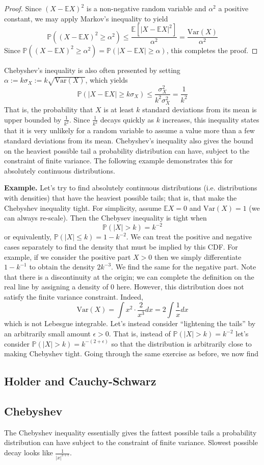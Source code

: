 \documentclass[12pt]{article}
\newcommand*{\abs}[1]{\left\lvert#1\right\rvert}
\newcommand{\E}{\mathbb{E}}
\newcommand{\Var}{\mathrm{Var}}
\newcommand{\Prob}{\mathbb{P}}
\begin{document}
\begin{proof}
Since $(X - \E X)^2$ is a non-negative random variable and $\alpha^2$ a positive constant, we may apply Markov's inequality to yield
\[\Prob((X - \E X)^2 \geq \alpha^2) \leq \frac{\E\left[\abs{X - \E X}^2\right]}{\alpha^2} = \frac{\Var(X)}{\alpha^2}\]
Since $\Prob((X - \E X)^2 \geq \alpha^2) = \Prob(\abs{X - \E X} \geq \alpha)$, this completes the proof. 
\end{proof}
Chebyshev's inequality is also often presented by setting $\alpha := k\sigma_X := k\sqrt{\Var(X)}$, which yields
\[\Prob(\abs{X - \E X} \geq k\sigma_X) \leq \frac{\sigma_X^2}{k^2 \sigma_X^2} = \frac{1}{k^2}\]
That is, the probability that $X$ is at least $k$ standard deviations from its mean is upper bounded by $\frac{1}{k^2}$. Since $\frac{1}{k^2}$ decays quickly as $k$ increases, this inequality states that it is 
very unlikely for a random variable to assume a value more than a few standard deviations from its mean. Chebyshev's inequality also gives the bound on the heaviest possible tail a probability distribution can 
have, subject to the constraint of finite variance. The following example demonstrates this for absolutely continuous distributions. 

\bigskip
\textbf{Example.} Let's try to find absolutely continuous distributions (i.e. distributions with densities) that have the heaviest possible tails; that is, that make the Chebyshev inequality tight. For simplicity, assume 
$\E X = 0$ and $\Var(X) = 1$ (we can always re-scale). Then the Chebysev inequality is tight when 
\[\Prob(\abs{X} > k) = k^{-2}\]
or equivalently, $\Prob(\abs{X} \leq k) = 1 - k^{-2}$. We can treat the positive and negative cases separately to find the density that must be implied by this CDF. For example, if we consider the positive part $X > 0$ 
then we simply differentiate $1 - k^{-1}$ to obtain the density $2k^{-3}$. We find the same for the negative part. Note that there is a discontinuity at the origin; we can complete the definition on the real line by assigning 
 a density of 0 here. However, this distribution does not satisfy the finite variance constraint. Indeed, 
 \[\Var(X) = \int x^2 \cdot \frac{2}{x^3} dx = 2 \int \frac{1}{x} dx\]
which is not Lebesgue integrable. Let's instead consider ``lightening the tails'' by an arbitrarily small amount $\epsilon > 0$. That is, instead of $\Prob(\abs{X} > k) = k^{-2}$ let's consider 
$\Prob(\abs{X} > k) = k^{-(2 + \epsilon)}$ so that the distribution is arbitrarily close to making Chebyshev tight. Going through the same exercise as before, we now find 

\subsection{Holder and Cauchy-Schwarz}

\subsection{Chebyshev}
The Chebyshev inequality essentially gives the fattest possible tails a probability distribution can have subject to the constraint of finite variance. Slowest possible decay looks like $\frac{1}{\abs{x}^{3 + \epsilon}}$.
\end{document}
